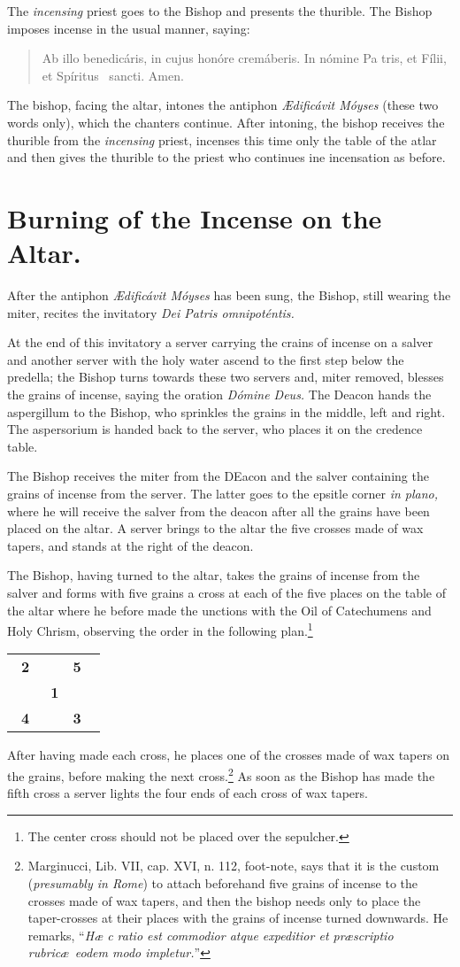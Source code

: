 \documentclass[letterpaper]{report}
\newcommand\blessincense{
\begin{quote}
   Ab illo benedicáris, in cujus honóre cremáberis. In nómine Pa\cross
    tris, et Fí\cross lii, et Spíritus \cross\ sancti. \rbar Amen.
\end{quote}
}
\newcommand\crossplan{
\begin{center}
    \begin{tabular}{ | l c r | }
       \hline
       \cross\ \textbf{2} &                    & \textbf{5} \cross\ \\
                          & \cross\ \textbf{1} &                    \\
       \cross\ \textbf{4} &                    & \textbf{3} \cross\ \\
       \hline
   \end{tabular} 
\end{center}
}
\begin{document}
{\rubric The \textit{incensing} priest goes to the Bishop and presents the
thurible. The Bishop imposes incense in the usual manner, saying:

\blessincense

The bishop, facing the altar, intones the antiphon \textit{\AE dificávit
Móyses} (these two words only), which the chanters continue. After intoning,
the bishop receives the thurible from the \textit{incensing} priest, incenses
this time only the table of the atlar and then gives the thurible to the priest
who continues ine incensation as before.

\section{Burning of the Incense on the Altar.}

\rubric After the antiphon \textit{\AE dificávit Móyses} has been sung, the
Bishop, still wearing the miter, recites the invitatory \textit{Dei Patris
omnipoténtis.}

\rubric At the end of this invitatory a server carrying the crains of incense
on a salver and another server with the holy water ascend to the first step
below the predella; the Bishop turns towards these two servers and, miter
removed, blesses the grains of incense, saying the oration \textit{Dómine
Deus.} The Deacon hands the aspergillum to the Bishop, who sprinkles the grains in
the middle, left and right. The aspersorium is handed back to the server, who
places it on the credence table.

The Bishop receives the miter from the DEacon and the salver containing the
grains of incense from the server. The latter goes to the epsitle corner
\textit{in plano,} where he will receive the salver from the deacon after all
the grains have been placed on the altar. A server brings to the altar the five
crosses made of wax tapers, and stands at the right of the deacon.

\rubric The Bishop, having turned to the altar, takes the grains of incense
from the salver and forms with five grains a cross at each of the five places
on the table of the altar where he before made the unctions with the Oil of
Catechumens and Holy Chrism, observing the order in the following
plan.\footnote{The center cross should not be placed over the sepulcher.}

\crossplan

After having made each cross, he places one of the crosses made of wax tapers
on the grains, before making the next cross.\footnote{Marginucci, Lib. VII,
cap. XVI, n. 112, foot-note, says that it is the custom (\textit{presumably in
Rome}) to attach beforehand five grains of incense to the crosses made of wax
tapers, and then the bishop needs only to place the taper-crosses at their
places with the grains of incense turned downwards. He remarks, ``\textit{H\ae
c ratio est commodior atque expeditior et pr\ae scriptio rubric\ae\ eodem modo
impletur.}''} As soon as the Bishop has made the fifth cross a server lights
the four ends of each cross of wax tapers.

}
\end{document}

